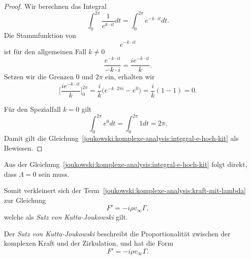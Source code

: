 \begin{proof}
	\label{joukowski:komplexe-analysis:proof:integral-e-hoch-kit}
	Wir berechnen das Integral
	\[
		\displaystyle\int_{0}^{2\pi}
		\frac{1}{e^{k \cdot i t}}
		dt
		=
		\displaystyle\int_{0}^{2\pi}
		e^{-k \cdot i t}
		dt.
	\]
	Die Stammfunktion von
	\[
		e^{-k \cdot i t}
	\]
	ist für den allgemeinen Fall $k \neq 0$
	\[
		\frac{e^{-k \cdot i t}}{-k \cdot i}
		=
		\frac{i e^{-k \cdot i t}}{k}.
	\]
	Setzen wir die Grenzen $0$ und $2\pi$ ein, erhalten wir
	\[
		\biggl[\frac{i e^{-k \cdot i t}}{k}\biggr]_{0}^{2\pi}
		=
		\frac{i}{k} \biggl(e^{-k \cdot 2\pi i} - e^{0}\biggr)
		=
		\frac{i}{k} (1 - 1)
		=
		0.
	\]
	
	Für den Spezialfall $k = 0$ gilt
	\[
		\displaystyle\int_{0}^{2\pi}
		e^{0}
		dt
		=
		\displaystyle\int_{0}^{2\pi}
		1
		dt
		=
		2\pi.
	\]
	Damit gilt die Gleichung~\eqref{joukowski:komplexe-analysis:integral-e-hoch-kit} als Bewiesen.
\end{proof}

Aus der Gleichung~\eqref{joukowski:komplexe-analysis:integral-e-hoch-kit} folgt direkt, dass $\Lambda = 0$ sein muss.

Somit verkleinert sich der Term~\eqref{joukowski:komplexe-analysis:kraft-mit-lambda} zur Gleichung 
\[
F' = -i \rho v_\infty \Gamma,
\] 
welche als \emph{Satz von Kutta-Joukowski} gilt.

\begin{satz}
	\label{joukowski:komplexe-analysis:satz:kutta-joukowski}
	Der \emph{Satz von Kutta-Joukowski} beschreibt die Proportionalität zwischen der komplexen Kraft und der Zirkulation,
	und hat die Form
	\[
	F'
	=
	-i \rho v_\infty \Gamma.
	\]
\end{satz}



